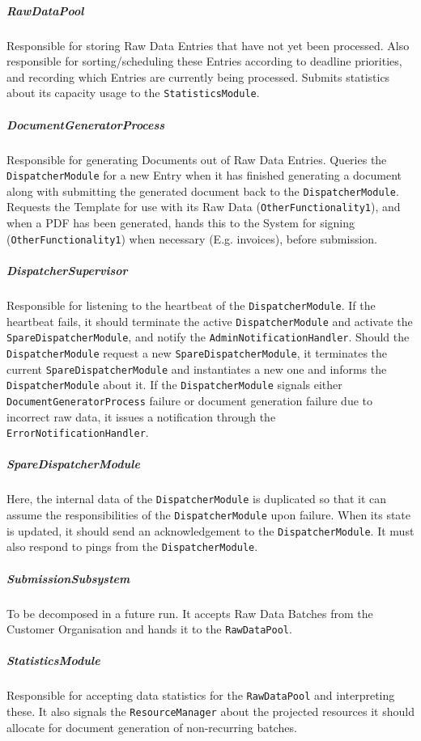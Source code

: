 \documentclass[a4paper,10pt]{article}
\begin{document}
\subparagraph{RawDataPool}
Responsible for storing Raw Data Entries that have not yet been processed. Also responsible for sorting/scheduling these Entries according to deadline priorities, and recording which Entries are currently being processed. Submits statistics about its capacity usage to the \texttt{StatisticsModule}.

\subparagraph{DocumentGeneratorProcess}
Responsible for generating Documents out of Raw Data Entries. Queries the \texttt{DispatcherModule} for a new Entry when it has finished generating a document along with submitting the generated document back to the \texttt{DispatcherModule}. Requests the Template for use with its Raw Data (\texttt{OtherFunctionality1}), and when a PDF has been generated, hands this to the System for signing (\texttt{OtherFunctionality1}) when necessary (E.g. invoices), before submission.

\subparagraph{DispatcherSupervisor}
Responsible for listening to the heartbeat of the \texttt{DispatcherModule}. If the heartbeat fails, it should terminate the active \texttt{DispatcherModule} and activate the \texttt{SpareDispatcherModule}, and notify the \texttt{AdminNotificationHandler}. Should the \texttt{DispatcherModule} request a new \texttt{Spare\-Dispatcher\-Module}, it terminates the current \texttt{Spare\-Dispatcher\-Module} and instantiates a new one and informs the \texttt{Dispatcher\-Module} about it. If the \texttt{Dispatcher\-Module} signals either \texttt{DocumentGeneratorProcess} failure or document generation failure due to incorrect raw data, it issues a notification through the \texttt{Error\-Notification\-Handler}.

\subparagraph{SpareDispatcherModule}
Here, the internal data of the \texttt{DispatcherModule} is duplicated so that it can assume the responsibilities of the \texttt{DispatcherModule} upon failure. When its state is updated, it should send an acknowledgement to the \texttt{DispatcherModule}. It must also respond to pings from the \texttt{DispatcherModule}.

\subparagraph{SubmissionSubsystem}
To be decomposed in a future run. It accepts Raw Data Batches from the Customer Organisation and hands it to the \texttt{RawDataPool}.

\subparagraph{StatisticsModule}
Responsible for accepting data statistics for the \texttt{RawDataPool} and interpreting these. It also signals the \texttt{ResourceManager} about the projected resources it should allocate for document generation of non-recurring batches.
\end{document}
